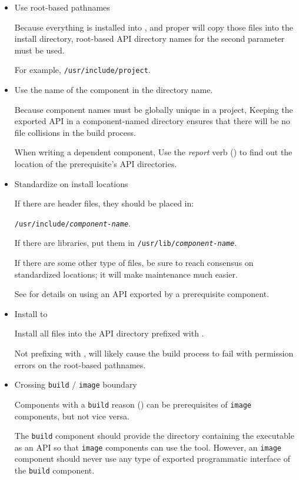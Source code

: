 \begin{itemize}
\item Use root-based pathnames

  Because everything is installed into \destdir, and \lmsbw proper
  will copy those files into the install directory, root-based API
  directory names for the second parameter must be used.

  For example, \texttt{/usr/include/project}.

\item Use the name of the component in the directory name.

  Because component names must be globally unique in a project,
  Keeping the exported API in a component-named directory ensures that
  there will be no file collisions in the build process.

  When writing a dependent component, Use the \emph{report} verb
  () to find out the location of the
  prerequisite's API directories.

\item Standardize on install locations

  If there are header files, they should be placed in:

  \texttt{/usr/include/\emph{component-name}}.

  If there are libraries, put them in
  \texttt{/usr/lib/\emph{component-name}}.

  If there are some other type of files, be sure to reach consensus on
  standardized locations; it will make maintenance much easier.

  See  for details on using an API
  exported by a prerequisite component.

\item Install to \destdir

  Install all files into the API directory prefixed with \destdir.

  Not prefixing with \destdir, will likely cause the build process to
  fail with permission errors on the root-based pathnames.

\item Crossing \texttt{build} / \texttt{image} boundary

  Components with a \texttt{build} reason ()
  can be prerequisites of \texttt{image} components, but not vice
  versa.

  The \texttt{build} component should provide the directory containing
  the executable as an API so that \texttt{image} components can use
  the tool.  However, an \texttt{image} component should never use any
  type of exported programmatic interface of the \texttt{build}
  component.

\end{itemize}

